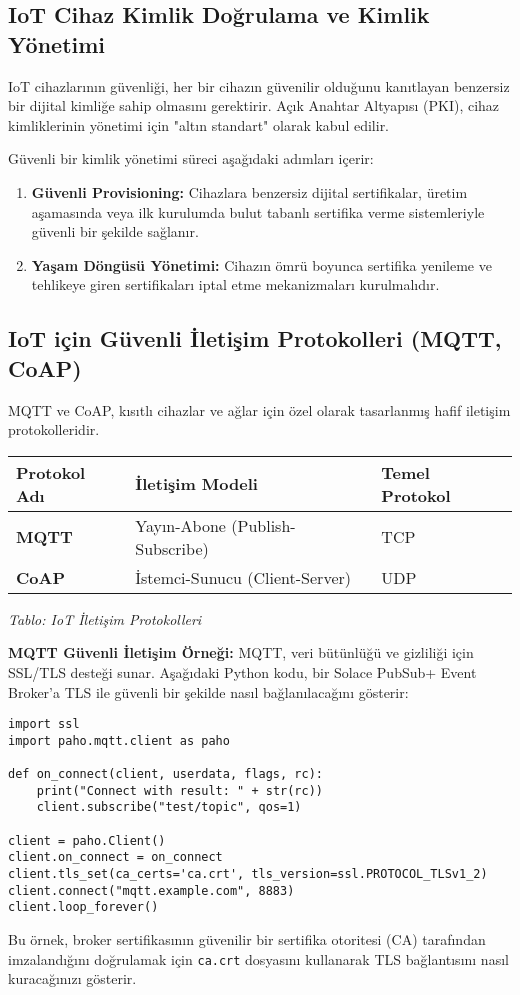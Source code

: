\subsection{IoT Cihaz Kimlik Doğrulama ve Kimlik Yönetimi}

IoT cihazlarının güvenliği, her bir cihazın güvenilir olduğunu kanıtlayan benzersiz bir dijital kimliğe sahip olmasını gerektirir. Açık Anahtar Altyapısı (PKI), cihaz kimliklerinin yönetimi için "altın standart" olarak kabul edilir.

Güvenli bir kimlik yönetimi süreci aşağıdaki adımları içerir:
\begin{enumerate}
    \item \textbf{Güvenli Provisioning:} Cihazlara benzersiz dijital sertifikalar, üretim aşamasında veya ilk kurulumda bulut tabanlı sertifika verme sistemleriyle güvenli bir şekilde sağlanır.
    \item \textbf{Yaşam Döngüsü Yönetimi:} Cihazın ömrü boyunca sertifika yenileme ve tehlikeye giren sertifikaları iptal etme mekanizmaları kurulmalıdır.
\end{enumerate}

\subsection{IoT için Güvenli İletişim Protokolleri (MQTT, CoAP)}

MQTT ve CoAP, kısıtlı cihazlar ve ağlar için özel olarak tasarlanmış hafif iletişim protokolleridir.

\begin{tabular}{|p{4cm}|p{6cm}|p{4cm}|}
\hline
\hline
\textbf{Protokol Adı} & \textbf{İletişim Modeli} & \textbf{Temel Protokol}  \\
\hline
\hline
\textbf{MQTT} & Yayın-Abone (Publish-Subscribe) & TCP  \\
\hline
\hline
\textbf{CoAP} & İstemci-Sunucu (Client-Server) & UDP  \\
\hline
\hline
\hline
\end{tabular}


\textit{Tablo: IoT İletişim Protokolleri}

\textbf{MQTT Güvenli İletişim Örneği:}
MQTT, veri bütünlüğü ve gizliliği için SSL/TLS desteği sunar. Aşağıdaki Python kodu, bir Solace PubSub+ Event Broker'a TLS ile güvenli bir şekilde nasıl bağlanılacağını gösterir:
\begin{lstlisting}[breaklines=true,basicstyle=\ttfamily\footnotesize]
import ssl
import paho.mqtt.client as paho

def on_connect(client, userdata, flags, rc):
    print("Connect with result: " + str(rc))
    client.subscribe("test/topic", qos=1)

client = paho.Client()
client.on_connect = on_connect
client.tls_set(ca_certs='ca.crt', tls_version=ssl.PROTOCOL_TLSv1_2)
client.connect("mqtt.example.com", 8883)
client.loop_forever()
\end{lstlisting}
Bu örnek, broker sertifikasının güvenilir bir sertifika otoritesi (CA) tarafından imzalandığını doğrulamak için \verb|ca.crt| dosyasını kullanarak TLS bağlantısını nasıl kuracağınızı gösterir.


